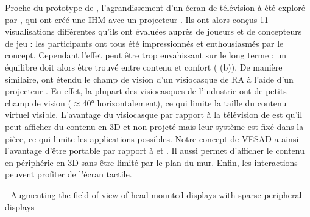 
Proche du prototype de \cite{Baudisch2002}, l'agrandissement d'un écran de télévision à été exploré par \cite{Jones2013}, qui ont créé une IHM  avec un projecteur . Ils ont alors conçus 11 visualisations différentes qu'ils ont évaluées auprès de joueurs et de concepteurs de jeu : les participants ont tous été impressionnés et enthousiasmés par le concept. Cependant l'effet peut être trop envahissant sur le long terme : un équilibre doit alors être trouvé entre contenu et confort ( (b)). De manière similaire, \cite{Benko2015} ont étendu le champ de vision d'un visiocasque de RA à l'aide d'un projecteur . En effet, la plupart des visiocasques de l'industrie ont de petits champ de vision ($\approx$\ang{40} horizontalement), ce qui limite la taille du contenu virtuel visible. L'avantage du visiocasque par rapport à la télévision de \cite{Jones2013} est qu'il peut afficher du contenu en 3D et non projeté mais leur système est fixé dans la pièce, ce qui limite les applications possibles. Notre concept de VESAD a ainsi l'avantage d'être portable par rapport à \cite{Jones2013} et \cite{Benko2015}. Il aussi permet d'afficher le contenu en périphérie en 3D sans être limité par le plan du mur. Enfin, les interactions peuvent profiter de l'écran tactile.



\cite{Xiao2016} - Augmenting the field-of-view of head-mounted displays with sparse peripheral displays

